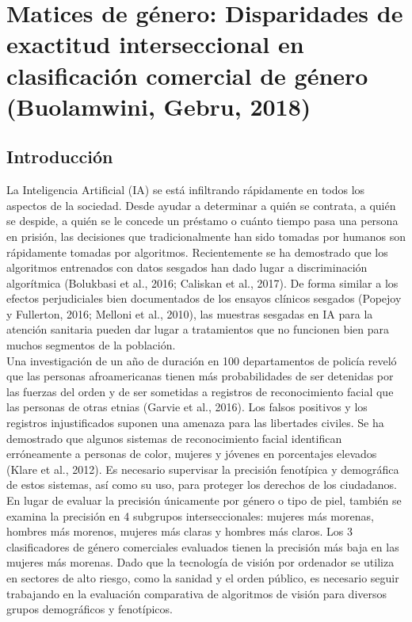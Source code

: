 \chapter{Matices de género: Disparidades de exactitud interseccional en clasificación comercial de género (Buolamwini, Gebru, 2018)}

\section{Introducción}
La Inteligencia Artificial (IA) se está infiltrando rápidamente en todos los aspectos de la sociedad. Desde ayudar a determinar a quién se contrata, a quién se despide, a quién se le concede un préstamo o cuánto tiempo pasa una persona en prisión, las decisiones que tradicionalmente han sido tomadas por humanos son rápidamente tomadas por algoritmos. Recientemente se ha demostrado que los algoritmos entrenados con datos sesgados han dado lugar a discriminación algorítmica (Bolukbasi et al., 2016; Caliskan et al., 2017). De forma similar a los efectos perjudiciales bien documentados de los ensayos clínicos sesgados (Popejoy y Fullerton, 2016; Melloni et al., 2010), las muestras sesgadas en IA para la atención sanitaria pueden dar lugar a tratamientos que no funcionen bien para muchos segmentos de la población.\\
Una investigación de un año de duración en 100 departamentos de policía reveló que las personas afroamericanas tienen más probabilidades de ser detenidas por las fuerzas del orden y de ser sometidas a registros de reconocimiento facial que las personas de otras etnias (Garvie et al., 2016). Los falsos positivos y los registros injustificados suponen una amenaza para las libertades civiles. Se ha demostrado que algunos sistemas de reconocimiento facial identifican erróneamente a personas de color, mujeres y jóvenes en porcentajes elevados (Klare et al., 2012). Es necesario supervisar la precisión fenotípica y demográfica de estos sistemas, así como su uso, para proteger los derechos de los ciudadanos.\\

En lugar de evaluar la precisión únicamente por género o tipo de piel, también se examina la precisión en 4 subgrupos interseccionales: mujeres más morenas, hombres más morenos, mujeres más claras y hombres más claros. Los 3 clasificadores de género comerciales evaluados tienen la precisión más baja en las mujeres más morenas. Dado que la tecnología de visión por ordenador se utiliza en sectores de alto riesgo, como la sanidad y el orden público, es necesario seguir trabajando en la evaluación comparativa de algoritmos de visión para diversos grupos demográficos y fenotípicos.

